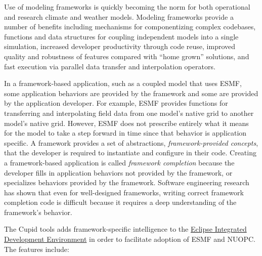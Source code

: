 \documentclass[oneside,11pt]{memoir}
\begin{document}
Use of modeling frameworks is quickly becoming the norm for both operational and research climate and weather models. Modeling frameworks provide a number of benefits including mechanisms for componentizing complex codebases, functions and data structures for coupling independent models into a single simulation, increased developer productivity through code reuse, improved quality and robustness of features compared with ``home grown'' solutions, and fast execution via parallel data transfer and interpolation operators. 

In a framework-based application, such as a coupled model that uses ESMF, some application behaviors are provided by the framework and some are provided by the application developer. For example, ESMF provides functions for transferring and interpolating field data from one model's native grid to another model's native grid. However, ESMF does not prescribe entirely what it means for the model to take a step forward in time since that behavior is application specific. A framework provides a set of abstractions, \emph{framework-provided concepts}, that the developer is required to instantiate and configure in their code. Creating a framework-based application is called \emph{framework completion} because the developer fills in application behaviors not provided by the framework, or specializes  behaviors provided by the framework. Software engineering research has shown that even for well-designed frameworks, writing correct framework completion code is difficult because it requires a deep understanding of the framework's behavior.

The Cupid tools adds framework-specific intelligence to the \href{https://www.eclipse.org/}{Eclipse Integrated Development Environment} in order to facilitate adoption of ESMF and NUOPC. The features include:
\end{document}
